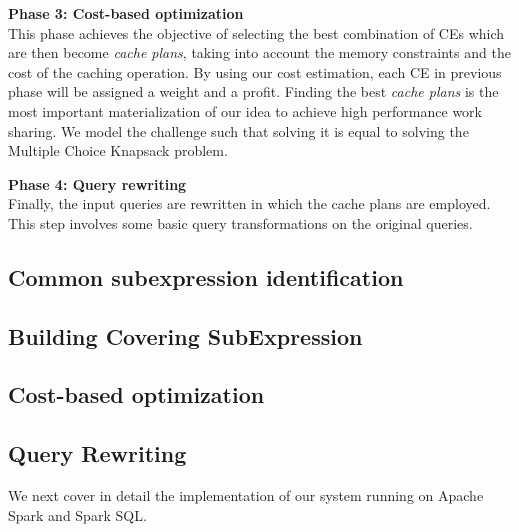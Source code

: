 \textbf{Phase 3: Cost-based optimization}\\
This phase achieves the objective of selecting the best combination of CEs which are then become \emph{cache plans}, taking into account the memory constraints and the cost of the caching operation. By using our cost estimation, each CE in previous phase will be assigned a weight and a profit. Finding the best \emph{cache plans} is the most important materialization of our idea to achieve high performance work sharing. We model the challenge such that solving it is equal to solving the Multiple Choice Knapsack problem.

\textbf{Phase 4: Query rewriting}\\
Finally, the input queries are rewritten in which the cache plans are employed. This step involves some basic query transformations on the original queries.

\subsection{Common subexpression identification}
\label{sec:common_sub}


\subsection{Building Covering SubExpression}
\label{sec:covering_subexpression}


\subsection{Cost-based optimization}
\label{sec:cbo}


\subsection{Query Rewriting}
\label{sec:query_rewriting}


We next cover in detail the implementation of our system running on Apache Spark and Spark SQL.